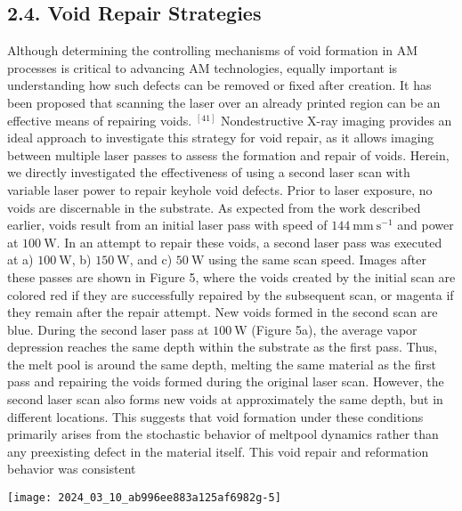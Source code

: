\documentclass[10pt]{article}
\begin{document}
\subsection*{2.4. Void Repair Strategies}
Although determining the controlling mechanisms of void formation in AM processes is critical to advancing AM technologies, equally important is understanding how such defects can be removed or fixed after creation. It has been proposed that scanning the laser over an already printed region can be an effective means of repairing voids. ${ }^{[41]}$ Nondestructive X-ray imaging provides an ideal approach to investigate this strategy for void repair, as it allows imaging between multiple laser passes to assess the formation and repair of voids. Herein, we directly investigated the effectiveness of using a second laser scan with variable laser power to repair keyhole void defects. Prior to laser exposure, no voids are discernable in the substrate. As expected from the work described earlier, voids result from an initial laser pass with speed of $144 \mathrm{~mm} \mathrm{~s}^{-1}$ and power at $100 \mathrm{~W}$. In an attempt to repair these voids, a second laser pass was executed at a) $100 \mathrm{~W}$, b) $150 \mathrm{~W}$, and c) $50 \mathrm{~W}$ using the same scan speed. Images after these passes are shown in Figure 5, where the voids created by the initial scan are colored red if they are successfully repaired by the subsequent scan, or magenta if they remain after the repair attempt. New voids formed in the second scan are blue. During the second laser pass at $100 \mathrm{~W}$ (Figure 5a), the average vapor depression reaches the same depth within the substrate as the first pass. Thus, the melt pool is around the same depth, melting the same material as the first pass and repairing the voids formed during the original laser scan. However, the second laser scan also forms new voids at approximately the same depth, but in different locations. This suggests that void formation under these conditions primarily arises from the stochastic behavior of meltpool dynamics rather than any preexisting defect in the material itself. This void repair and reformation behavior was consistent

\begin{center}
\texttt{[image: 2024\_03\_10\_ab996ee883a125af6982g-5]}
\end{center}
\end{document}
